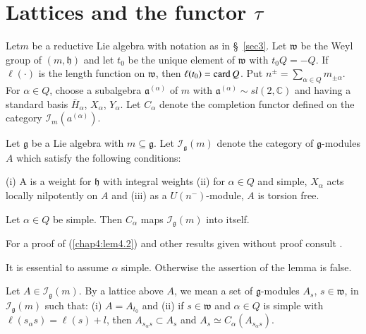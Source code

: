 
\chapter{Lattices and the functor $\tau$}\label{sec4}

Let\pageoriginale $m$ be a reductive Lie algebra with notation as in
\S\ \ref{sec3}. Let $\mathfrak{w}$ be the Weyl group of $(m, \mathfrak{h})$ and
let $t_0$ be the unique element of $\mathfrak{w}$ with $t_0 Q = -
Q$. If $\ell(\cdot)$ is the length function on $\mathfrak{w}$, then
$\ell(t_0) = \operatorname{card} Q $. Put $n^{\pm} = \sum\limits_{\alpha \in Q}
m_{\pm \alpha}$. For $\alpha \in Q$, choose a subalgebra
$\mathfrak{a}^{(\alpha)}$ of $m$ with $\mathfrak{a}^{(\alpha)} \sim sl
(2, \mathbb{C})$ and having a standard basis $\bar{H}_\alpha$,
$X_\alpha$, $Y_\alpha$. Let $C_\alpha$ denote the completion functor
defined on the category $\mathscr{I}_m(a^{(\alpha)})$.

\begin{definition}\label{chap4:def4.1}
Let $\mathfrak{g}$ be a Lie algebra with $m \subseteq
\mathfrak{g}$. Let $\mathscr{I}_\mathfrak{g} (m)$ denote the category
of $\mathfrak{g}$-modules $A$ which satisfy the following conditions:

(i) A is a weight for $\mathfrak{h}$ with integral weights (ii) for
$\alpha \in Q$ and simple, $X_\alpha$ acts locally nilpotently on $A$
and  (iii) as a $U(n^-)$-module, $A$ is torsion free.
\end{definition}

\begin{lemma}\label{chap4:lem4.2}
Let $\alpha \in Q$ be simple. Then $C_\alpha$ maps
$\mathscr{I}_\mathfrak{g}(m)$ into itself.
\end{lemma}

For a proof of (\ref{chap4:lem4.2}) and other results given without
proof consult \cite[\S \ref{sec4}]{key15}.

\begin{remark*}
It is essential to assume $\alpha$ simple. Otherwise the assertion of
the lemma is false.
\end{remark*}

\begin{definition}\label{chap4:def4.3}%
Let $A \in\mathscr{I}_\mathfrak{g}(m)$. By a lattice above $A$, we
mean a set of $\mathfrak{g}$-modules $A_s$, $s \in \mathfrak{w}$, in
$\mathscr{I}_\mathfrak{g}(m)$ such that: (i) $A = A_{t_0}$ and (ii) if
$s \in \mathfrak{w}$ and $\alpha \in Q$ is simple with $\ell (s_\alpha
s) = \ell (s)+l$, then $A_{s_\alpha s} \subset A_s$ and $A_s \simeq
C_\alpha (A_{s_\alpha s})$.
\end{definition}

